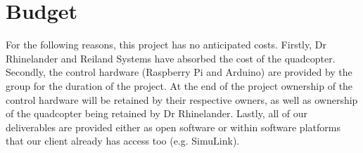 \section{Budget}
For the following reasons, this project has no anticipated costs.  Firstly, Dr Rhinelander and Reiland Systems have absorbed the cost of the quadcopter.  Secondly, the control hardware (Raspberry Pi and Arduino) are provided by the group for the duration of the project.  At the end of the project ownership of the control hardware will be retained by their respective owners, as well as ownership of the quadcopter being retained by Dr Rhinelander.  Lastly, all of our deliverables are provided either as open software or within software platforms that our client already has access too (e.g. SimuLink).
